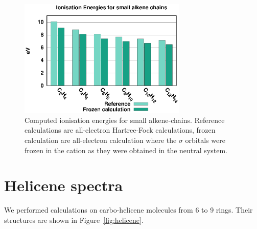 \documentclass[aip]{revtex4-1}
\begin{document}
\begin{figure}
\begin{center}
\includegraphics[width=8cm]{froz_comp}
\end{center}
\caption{Computed ionisation energies for small alkene-chains. Reference calculations are all-electron Hartree-Fock calculations, frozen calculation 
are all-electron calculation where the $\sigma$ orbitals were frozen in the cation as they were obtained in the neutral system.}
\label{fig:froz_comp}
\end{figure}

%

\section*{Helicene spectra}
We performed calculations on carbo-helicene molecules from 6 to 9 rings. Their structures are
shown in Figure~\ref{fig:helicene}.
\end{document}
